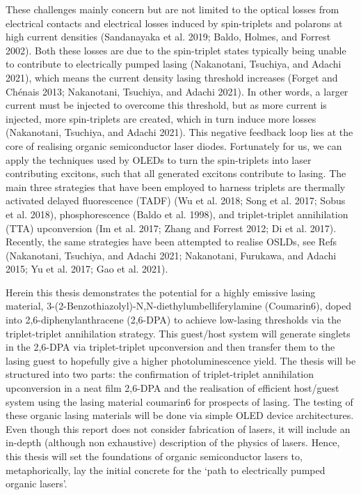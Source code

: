 \documentclass[
  letterpaper,
  DIV=11,
  numbers=noendperiod,
  oneside]{scrreprt}
\begin{document}
These challenges mainly concern but are not limited to the optical
losses from electrical contacts and electrical losses induced by
spin-triplets and polarons at high current densities (Sandanayaka et al.
2019; Baldo, Holmes, and Forrest 2002). Both these losses are due to the
spin-triplet states typically being unable to contribute to electrically
pumped lasing (Nakanotani, Tsuchiya, and Adachi 2021), which means the
current density lasing threshold increases (Forget and Chénais 2013;
Nakanotani, Tsuchiya, and Adachi 2021). In other words, a larger current
must be injected to overcome this threshold, but as more current is
injected, more spin-triplets are created, which in turn induce more
losses (Nakanotani, Tsuchiya, and Adachi 2021). This negative feedback
loop lies at the core of realising organic semiconductor laser diodes.
Fortunately for us, we can apply the techniques used by OLEDs to turn
the spin-triplets into laser contributing excitons, such that all
generated excitons contribute to lasing. The main three strategies that
have been employed to harness triplets are thermally activated delayed
fluorescence (TADF) (Wu et al. 2018; Song et al. 2017; Sobus et al.
2018), phosphorescence (Baldo et al. 1998), and triplet-triplet
annihilation (TTA) upconversion (Im et al. 2017; Zhang and Forrest 2012;
Di et al. 2017). Recently, the same strategies have been attempted to
realise OSLDs, see Refs (Nakanotani, Tsuchiya, and Adachi 2021;
Nakanotani, Furukawa, and Adachi 2015; Yu et al. 2017; Gao et al. 2021).

Herein this thesis demonstrates the potential for a highly emissive
lasing material, 3-(2-Benzothiazolyl)-N,N-diethylumbelliferylamine
(Coumarin6), doped into 2,6-diphenylanthracene (2,6-DPA) to achieve
low-lasing thresholds via the triplet-triplet annihilation strategy.
This guest/host system will generate singlets in the 2,6-DPA via
triplet-triplet upconversion and then transfer them to the lasing guest
to hopefully give a higher photoluminescence yield. The thesis will be
structured into two parts: the confirmation of triplet-triplet
annihilation upconversion in a neat film 2,6-DPA and the realisation of
efficient host/guest system using the lasing material coumarin6 for
prospects of lasing. The testing of these organic lasing materials will
be done via simple OLED device architectures. Even though this report
does not consider fabrication of lasers, it will include an in-depth
(although non exhaustive) description of the physics of lasers. Hence,
this thesis will set the foundations of organic semiconductor lasers to,
metaphorically, lay the initial concrete for the `path to electrically
pumped organic lasers'.
\end{document}
